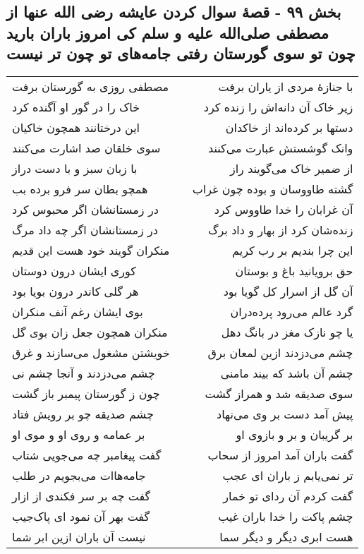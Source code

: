 \begin{center}
\section*{بخش ۹۹ - قصهٔ سوال کردن عایشه رضی الله عنها از مصطفی صلی‌الله علیه و سلم کی امروز باران بارید چون تو سوی گورستان رفتی جامه‌های تو چون تر نیست}
\label{sec:sh099}
\begin{longtable}{l p{0.5cm} r}
مصطفی روزی به گورستان برفت
&&
با جنازهٔ مردی از یاران برفت
\\
خاک را در گور او آگنده کرد
&&
زیر خاک آن دانه‌اش را زنده کرد
\\
این درختانند همچون خاکیان
&&
دستها بر کرده‌اند از خاکدان
\\
سوی خلقان صد اشارت می‌کنند
&&
وانک گوشستش عبارت می‌کنند
\\
با زبان سبز و با دست دراز
&&
از ضمیر خاک می‌گویند راز
\\
همچو بطان سر فرو برده بب
&&
گشته طاووسان و بوده چون غراب
\\
در زمستانشان اگر محبوس کرد
&&
آن غرابان را خدا طاووس کرد
\\
در زمستانشان اگر چه داد مرگ
&&
زنده‌شان کرد از بهار و داد برگ
\\
منکران گویند خود هست این قدیم
&&
این چرا بندیم بر رب کریم
\\
کوری ایشان درون دوستان
&&
حق برویانید باغ و بوستان
\\
هر گلی کاندر درون بویا بود
&&
آن گل از اسرار کل گویا بود
\\
بوی ایشان رغم آنف منکران
&&
گرد عالم می‌رود پرده‌دران
\\
منکران همچون جعل زان بوی گل
&&
یا چو نازک مغز در بانگ دهل
\\
خویشتن مشغول می‌سازند و غرق
&&
چشم می‌دزدند ازین لمعان برق
\\
چشم می‌دزدند و آنجا چشم نی
&&
چشم آن باشد که بیند مامنی
\\
چون ز گورستان پیمبر باز گشت
&&
سوی صدیقه شد و همراز گشت
\\
چشم صدیقه چو بر رویش فتاد
&&
پیش آمد دست بر وی می‌نهاد
\\
بر عمامه و روی او و موی او
&&
بر گریبان و بر و بازوی او
\\
گفت پیغامبر چه می‌جویی شتاب
&&
گفت باران آمد امروز از سحاب
\\
جامه‌هاات می‌بجویم در طلب
&&
تر نمی‌یابم ز باران ای عجب
\\
گفت چه بر سر فکندی از ازار
&&
گفت کردم آن ردای تو خمار
\\
گفت بهر آن نمود ای پاک‌جیب
&&
چشم پاکت را خدا باران غیب
\\
نیست آن باران ازین ابر شما
&&
هست ابری دیگر و دیگر سما
\\
\end{longtable}
\end{center}
